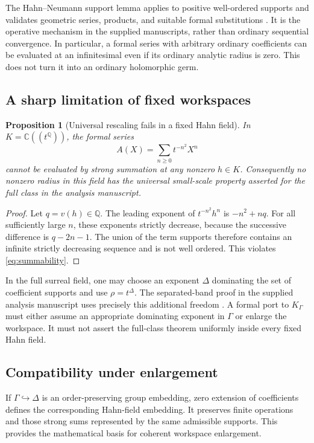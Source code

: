 \documentclass[11pt,letterpaper]{article}
\numberwithin{equation}{section}
\newtheorem{proposition}[theorem]{Proposition}
\theoremstyle{definition}
\theoremstyle{remark}
\newcommand{\C}{\mathbb{C}}
\newcommand{\Q}{\mathbb{Q}}
\begin{document}
The Hahn--Neumann support lemma applies to positive well-ordered supports and validates geometric series, products, and suitable formal substitutions \cite{Neumann}. It is the operative mechanism in the supplied manuscripts, rather than ordinary sequential convergence. In particular, a formal series with arbitrary ordinary coefficients can be evaluated at an infinitesimal even if its ordinary analytic radius is zero. This does not turn it into an ordinary holomorphic germ.

\subsection{A sharp limitation of fixed workspaces}
\begin{proposition}[Universal rescaling fails in a fixed Hahn field]\label{prop:rescaling}
In $K=\C((t^\Q))$, the formal series
\[
 A(X)=\sum_{n\ge0}t^{-n^2}X^n
\]
cannot be evaluated by strong summation at any nonzero $h\in K$. Consequently no nonzero radius in this field has the universal small-scale property asserted for the full class in the analysis manuscript.
\end{proposition}
\begin{proof}
Let $q=v(h)\in\Q$. The leading exponent of $t^{-n^2}h^n$ is $-n^2+nq$. For all sufficiently large $n$, these exponents strictly decrease, because the successive difference is $q-2n-1$. The union of the term supports therefore contains an infinite strictly decreasing sequence and is not well ordered. This violates \eqref{eq:summability}.
\end{proof}

In the full surreal field, one may choose an exponent $\Delta$ dominating the set of coefficient supports and use $\rho=t^\Delta$. The separated-band proof in the supplied analysis manuscript uses precisely this additional freedom \cite[\S4.1]{AnalysisSource}. A formal port to $K_\Gamma$ must either assume an appropriate dominating exponent in $\Gamma$ or enlarge the workspace. It must not assert the full-class theorem uniformly inside every fixed Hahn field.

\subsection{Compatibility under enlargement}
If $\Gamma\hookrightarrow\Delta$ is an order-preserving group embedding, zero extension of coefficients defines the corresponding Hahn-field embedding. It preserves finite operations and those strong sums represented by the same admissible supports. This provides the mathematical basis for coherent workspace enlargement.
\end{document}
